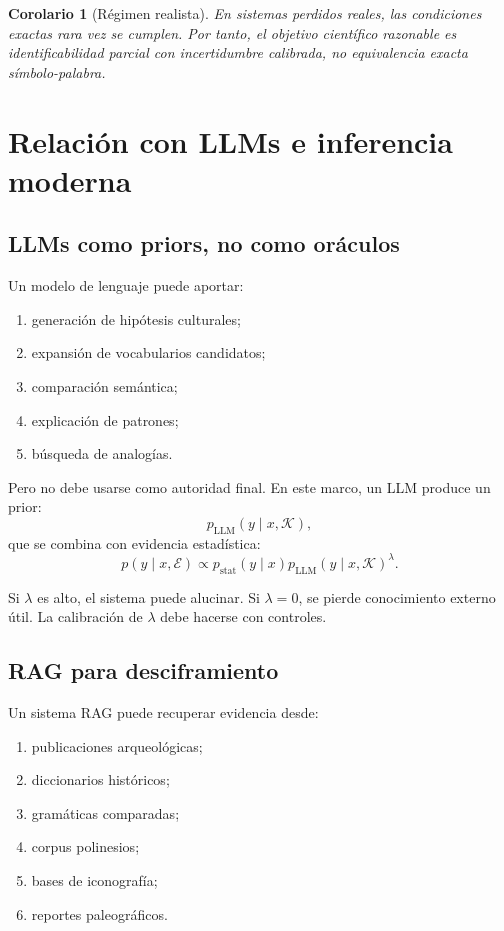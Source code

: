 \documentclass[11pt,a4paper]{article}
\newtheorem{corollary}[theorem]{Corolario}
\newcommand{\1}{\mathbf{1}}
\numberwithin{equation}{section}
\begin{document}
\begin{corollary}[Régimen realista]
En sistemas perdidos reales, las condiciones exactas rara vez se cumplen. Por tanto, el objetivo científico razonable es identificabilidad parcial con incertidumbre calibrada, no equivalencia exacta símbolo-palabra.
\end{corollary}

\section{Relación con LLMs e inferencia moderna}

\subsection{LLMs como priors, no como oráculos}

Un modelo de lenguaje puede aportar:
\begin{enumerate}[label=(\roman*)]
    \item generación de hipótesis culturales;
    \item expansión de vocabularios candidatos;
    \item comparación semántica;
    \item explicación de patrones;
    \item búsqueda de analogías.
\end{enumerate}

Pero no debe usarse como autoridad final. En este marco, un LLM produce un prior:
\[
    p_{\mathrm{LLM}}(y\mid x,\mathcal{K}),
\]
que se combina con evidencia estadística:
\[
    p(y\mid x,\mathcal{E})
    \propto
    p_{\mathrm{stat}}(y\mid x)
    p_{\mathrm{LLM}}(y\mid x,\mathcal{K})^\lambda.
\]

Si \(\lambda\) es alto, el sistema puede alucinar. Si \(\lambda=0\), se pierde conocimiento externo útil. La calibración de \(\lambda\) debe hacerse con controles.

\subsection{RAG para desciframiento}

Un sistema RAG puede recuperar evidencia desde:
\begin{enumerate}[label=(\roman*)]
    \item publicaciones arqueológicas;
    \item diccionarios históricos;
    \item gramáticas comparadas;
    \item corpus polinesios;
    \item bases de iconografía;
    \item reportes paleográficos.
\end{enumerate}
\end{document}
